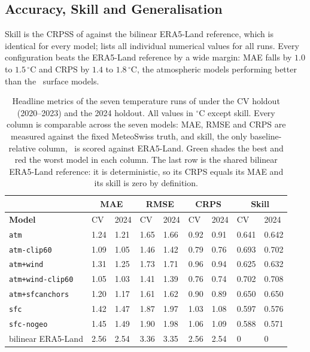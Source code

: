 \subsection{Accuracy, Skill and Generalisation}\label{subsec:single-tmax-headline}



Skill is the CRPSS of  against the bilinear ERA5-Land reference, which is identical for every model;  lists all individual numerical values for all runs. Every configuration beats the ERA5-Land reference by a wide margin: MAE falls by $1.0$ to $1.5\,^{\circ}\mathrm{C}$ and CRPS by $1.4$ to $1.8\,^{\circ}\mathrm{C}$, the atmospheric models performing better than the  surface models.

\begin{table}[H]
\centering
\caption[Temperature metrics, CV holdout vs 2024 holdout]{Headline metrics of the seven temperature runs of  under the CV holdout (2020--2023) and the 2024 holdout. All values in $^{\circ}\mathrm{C}$ except skill. Every column is comparable across the seven models: MAE, RMSE and CRPS are measured against the fixed MeteoSwiss truth, and skill, the only baseline-relative column,  is scored against ERA5-Land. Green shades the best and red the worst model in each column. The last row is the shared bilinear ERA5-Land reference: it is deterministic, so its CRPS equals its MAE and its skill is zero by definition.}
\label{tab:single-tmax-headline}
\footnotesize
\begin{tabular}{|p{3cm}|p{0.85cm}|p{0.85cm}|p{0.85cm}|p{0.85cm}|p{0.85cm}|p{0.85cm}|p{0.85cm}|p{0.85cm}|}
\hline
& \multicolumn{2}{c|}{\textbf{MAE}} & \multicolumn{2}{c|}{\textbf{RMSE}} & \multicolumn{2}{c|}{\textbf{CRPS}} & \multicolumn{2}{c|}{\textbf{Skill}} \\
\hline
\textbf{Model} & CV & 2024 & CV & 2024 & CV & 2024 & CV & 2024 \\
\hline
\texttt{atm} & 1.24 & 1.21 & 1.65 & 1.66 & 0.92 & 0.91 & 0.641 & 0.642 \\
\hline
\texttt{atm-clip60} & 1.09 & 1.05 & 1.46 & 1.42 & 0.79 & 0.76 & 0.693 & 0.702 \\
\hline
\texttt{atm+wind} & 1.31 & 1.25 & 1.73 & 1.71 & 0.96 & 0.94 & 0.625 & 0.632 \\
\hline
\rowcolor{green!12}\texttt{atm+wind-clip60} & 1.05 & 1.03 & 1.41 & 1.39 & 0.76 & 0.74 & 0.702 & 0.708 \\
\hline
\texttt{atm+sfcanchors} & 1.20 & 1.17 & 1.61 & 1.62 & 0.90 & 0.89 & 0.650 & 0.650 \\
\hline
\texttt{sfc} & 1.42 & 1.47 & 1.87 & 1.97 & 1.03 & 1.08 & 0.597 & 0.576 \\
\hline
\rowcolor{red!12}\texttt{sfc-nogeo} & 1.45 & 1.49 & 1.90 & 1.98 & 1.06 & 1.09 & 0.588 & 0.571 \\
\hline
bilinear ERA5-Land & 2.56 & 2.54 & 3.36 & 3.35 & 2.56 & 2.54 & 0 & 0 \\
\hline
\end{tabular}
\end{table}




